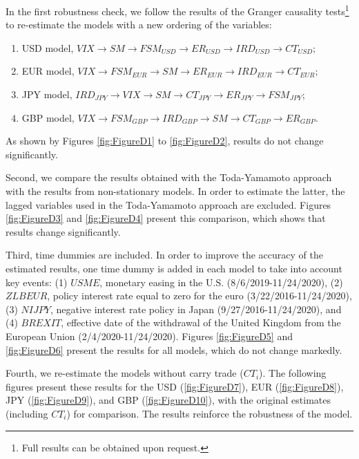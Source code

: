 \documentclass[a4paper, twoside]{templates/ociamthesis}
\begin{document}
In the first robustness check, we follow the results of the Granger causality tests\footnote{Full results can be obtained upon request.} to re-estimate the models with a new ordering of the variables:

\begin{enumerate}
\def\labelenumi{\arabic{enumi})}
\item
  USD model, \(VIX\)\(\rightarrow\)\(SM\)\(\rightarrow\)\(FSM_{USD}\)\(\rightarrow\)\(ER_{USD}\)\(\rightarrow\)\(IRD_{USD}\)\(\rightarrow\)\(CT_{USD}\);
\item
  EUR model, \(VIX\)\(\rightarrow\)\(FSM_{EUR}\)\(\rightarrow\)\(SM\)\(\rightarrow\)\(ER_{EUR}\)\(\rightarrow\)\(IRD_{EUR}\)\(\rightarrow\)\(CT_{EUR}\);
\item
  JPY model, \(IRD_{JPY}\)\(\rightarrow\)\(VIX\)\(\rightarrow\)\(SM\)\(\rightarrow\)\(CT_{JPY}\)\(\rightarrow\)\(ER_{JPY}\)\(\rightarrow\)\(FSM_{JPY}\);
\item
  GBP model, \(VIX\)\(\rightarrow\)\(FSM_{GBP}\)\(\rightarrow\)\(IRD_{GBP}\)\(\rightarrow\)\(SM\)\(\rightarrow\)\(CT_{GBP}\)\(\rightarrow\)\(ER_{GBP}\).
\end{enumerate}

As shown by Figures \ref{fig:FigureD1} to \ref{fig:FigureD2}, results do not change significantly.

Second, we compare the results obtained with the Toda-Yamamoto approach with the results from non-stationary models. In order to estimate the latter, the lagged variables used in the Toda-Yamamoto approach are excluded. Figures \ref{fig:FigureD3} and \ref{fig:FigureD4} present this comparison, which shows that results change significantly.

Third, time dummies are included. In order to improve the accuracy of the estimated results, one time dummy is added in each model to take into account key events: (1) \(USME\), monetary easing in the U.S. (8/6/2019-11/24/2020), (2) \(ZLBEUR\), policy interest rate equal to zero for the euro (3/22/2016-11/24/2020), (3) \(NIJPY\), negative interest rate policy in Japan (9/27/2016-11/24/2020), and (4) \(BREXIT\), effective date of the withdrawal of the United Kingdom from the European Union (2/4/2020-11/24/2020). Figures \ref{fig:FigureD5} and \ref{fig:FigureD6} present the results for all models, which do not change markedly.

Fourth, we re-estimate the models without carry trade (\(CT_{i}\)). The following figures present these results for the USD (\ref{fig:FigureD7}), EUR (\ref{fig:FigureD8}), JPY (\ref{fig:FigureD9}), and GBP (\ref{fig:FigureD10}), with the original estimates (including \(CT_{i}\)) for comparison. The results reinforce the robustness of the model.
\end{document}

